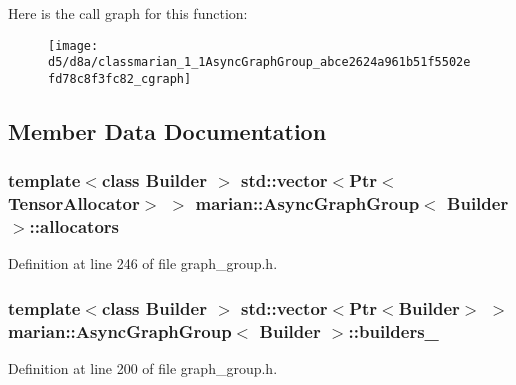 Here is the call graph for this function\+:
\nopagebreak
\begin{figure}[H]
\begin{center}
\leavevmode
\texttt{[image: d5/d8a/classmarian\_1\_1AsyncGraphGroup\_abce2624a961b51f5502efd78c8f3fc82\_cgraph]}
\end{center}
\end{figure}




\subsection{Member Data Documentation}
\subsubsection[{\texorpdfstring{allocators}{allocators}}]{\setlength{\rightskip}{0pt plus 5cm}template$<$class Builder $>$ std\+::vector$<${\bf Ptr}$<${\bf Tensor\+Allocator}$>$ $>$ {\bf marian\+::\+Async\+Graph\+Group}$<$ Builder $>$\+::allocators\hspace{0.3cm}{\ttfamily [private]}}\hypertarget{classmarian_1_1AsyncGraphGroup_a0ea898056bf8730db2389efbfc0eda89}{}\label{classmarian_1_1AsyncGraphGroup_a0ea898056bf8730db2389efbfc0eda89}


Definition at line 246 of file graph\+\_\+group.\+h.

\subsubsection[{\texorpdfstring{builders\+\_\+}{builders_}}]{\setlength{\rightskip}{0pt plus 5cm}template$<$class Builder $>$ std\+::vector$<${\bf Ptr}$<$Builder$>$ $>$ {\bf marian\+::\+Async\+Graph\+Group}$<$ Builder $>$\+::builders\+\_\+\hspace{0.3cm}{\ttfamily [private]}}\hypertarget{classmarian_1_1AsyncGraphGroup_a61b13f7dea620b83b33958d0b8970601}{}\label{classmarian_1_1AsyncGraphGroup_a61b13f7dea620b83b33958d0b8970601}


Definition at line 200 of file graph\+\_\+group.\+h.

